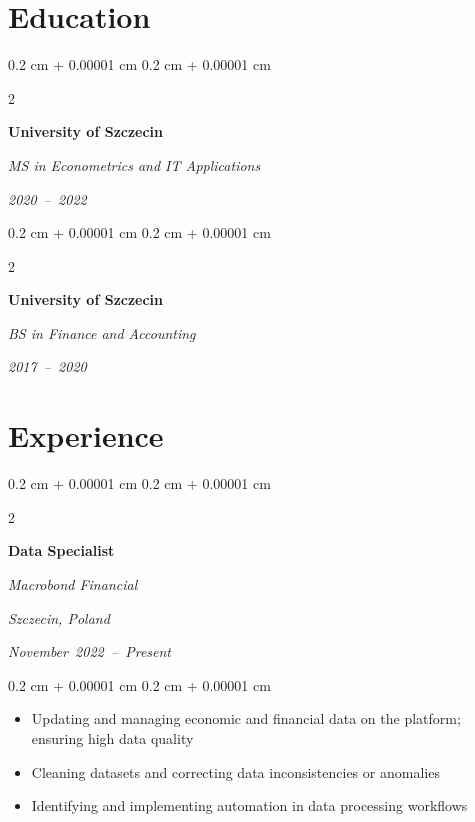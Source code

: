 \documentclass[10pt, letterpaper]{article}
\newenvironment{highlights}{
    \begin{itemize}[
        topsep=0.10 cm,
        parsep=0.10 cm,
        partopsep=0pt,
        itemsep=0pt,
        leftmargin=0.4 cm + 10pt
    ]
}{
    \end{itemize}
} %
\newenvironment{onecolentry}{
    \begin{adjustwidth}{
        0.2 cm + 0.00001 cm
    }{
        0.2 cm + 0.00001 cm
    }
}{
    \end{adjustwidth}
} %
\newenvironment{twocolentry}[2][]{
    \onecolentry
    \def\secondColumn{#2}
    \setcolumnwidth{\fill, 4.5 cm}
    \begin{paracol}{2}
}{
    \switchcolumn \raggedleft \secondColumn
    \end{paracol}
    \endonecolentry
} %
\begin{document}
      \section{Education}



        
      
      \begin{twocolentry}{
          \textit{2020~–~2022}
      }
          \textbf{University of Szczecin}
      
          \textit{MS in Econometrics and IT Applications}
      \end{twocolentry}
      \vspace{0.15 cm}
      
      \begin{twocolentry}{
          \textit{2017~–~2020}
      }
          \textbf{University of Szczecin}
      
          \textit{BS in Finance and Accounting}
      \end{twocolentry}
      \vspace{0.15 cm}
      



    
      \section{Experience}



        
      
      \begin{twocolentry}{
          \textit{Szczecin, Poland}
      
          \textit{November~2022~–~Present}
      }
          \textbf{Data Specialist}
      
          \textit{Macrobond Financial}
      \end{twocolentry}
      
      \vspace{0.10 cm}
      \begin{onecolentry}
          \begin{highlights}
              
              \item Updating and managing economic and financial data on the platform; ensuring high data quality
              
              \item Cleaning datasets and correcting data inconsistencies or anomalies
              
              \item Identifying and implementing automation in data processing workflows
              
          \end{highlights}
      \end{onecolentry}
      
\end{document}
